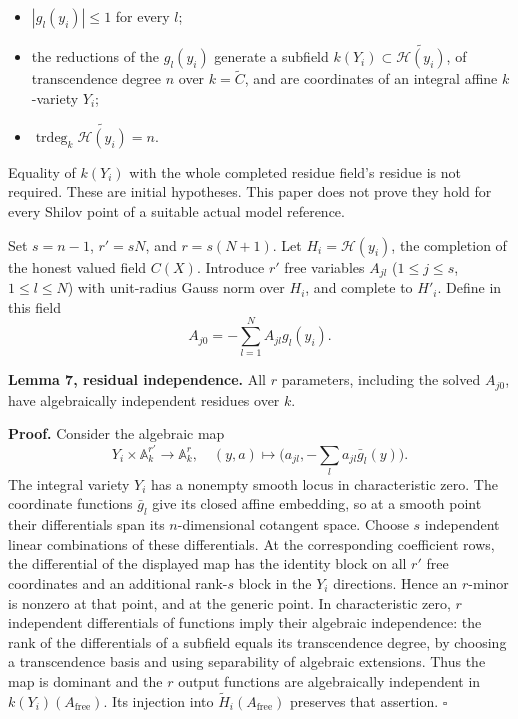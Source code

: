 \documentclass[
  11pt,
]{article}
\providecommand{\tightlist}{%
  \setlength{\itemsep}{0pt}\setlength{\parskip}{0pt}}
\begin{document}
\begin{itemize}
\tightlist
\item
  \(|g_l(y_i)|\leq1\) for every \(l\);
\item
  the reductions of the \(g_l(y_i)\) generate a subfield
  \(k(Y_i)\subset\widetilde{\mathcal H(y_i)}\), of transcendence degree
  \(n\) over \(k=\widetilde C\), and are coordinates of an integral
  affine \(k\)-variety \(Y_i\);
\item
  \(\operatorname{trdeg}_k\widetilde{\mathcal H(y_i)}=n\).
\end{itemize}

Equality of \(k(Y_i)\) with the whole completed residue field's residue
is not required. These are initial hypotheses. This paper does not prove
they hold for every Shilov point of a suitable actual model reference.

Set \(s=n-1\), \(r'=sN\), and \(r=s(N+1)\). Let \(H_i=\mathcal H(y_i)\),
the completion of the honest valued field \(C(X)\). Introduce \(r'\)
free variables \(A_{jl}\) (\(1\leq j\leq s\), \(1\leq l\leq N\)) with
unit-radius Gauss norm over \(H_i\), and complete to \(H'_i\). Define in
this field \[
 A_{j0}=-\sum_{l=1}^N A_{jl}g_l(y_i).
\]

\textbf{Lemma 7, residual independence.} All \(r\) parameters, including
the solved \(A_{j0}\), have algebraically independent residues over
\(k\).

\textbf{Proof.} Consider the algebraic map \[
 Y_i\times\mathbb A^{r'}_k\longrightarrow\mathbb A^r_k,
 \quad (y,a)\longmapsto\bigl(a_{jl},-\sum_l a_{jl}\bar g_l(y)\bigr).
\] The integral variety \(Y_i\) has a nonempty smooth locus in
characteristic zero. The coordinate functions \(\bar g_l\) give its
closed affine embedding, so at a smooth point their differentials span
its \(n\)-dimensional cotangent space. Choose \(s\) independent linear
combinations of these differentials. At the corresponding coefficient
rows, the differential of the displayed map has the identity block on
all \(r'\) free coordinates and an additional rank-\(s\) block in the
\(Y_i\) directions. Hence an \(r\)-minor is nonzero at that point, and
at the generic point. In characteristic zero, \(r\) independent
differentials of functions imply their algebraic independence: the rank
of the differentials of a subfield equals its transcendence degree, by
choosing a transcendence basis and using separability of algebraic
extensions. Thus the map is dominant and the \(r\) output functions are
algebraically independent in \(k(Y_i)(A_{\mathrm{free}})\). Its
injection into \(\widetilde H_i(A_{\mathrm{free}})\) preserves that
assertion. \(\square\)
\end{document}
